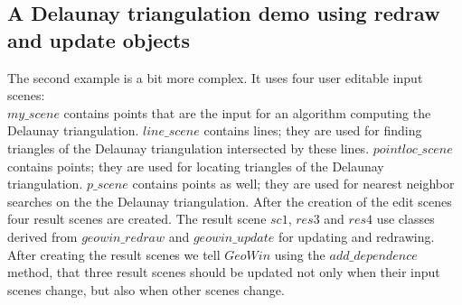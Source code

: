 
\ccHtmlLinksOn


\subsection{A Delaunay triangulation demo using redraw and update objects}

The second example is a bit more complex. It uses four user editable input scenes:\\
$my\_scene$ contains points that are the input for an algorithm computing the
Delaunay triangulation.
$line\_scene$ contains lines; they are used for finding triangles of the Delaunay
triangulation intersected by these lines.
$pointloc\_scene$ contains points; they are used for locating triangles of the Delaunay
triangulation.
$p\_scene$ contains points as well; they are used for nearest neighbor searches on the
the Delaunay triangulation.
After the creation of the edit scenes four result scenes are created. The result scene
$sc1$, $res3$ and $res4$ use classes derived from $geowin\_redraw$ and $geowin\_update$ for
updating and redrawing.
After creating the result scenes we tell $GeoWin$ using the $add\_dependence$ method,
that three result scenes should be updated not only when their input scenes change, but also
when other scenes change.

\ccHtmlLinksOff


\ccHtmlLinksOn
